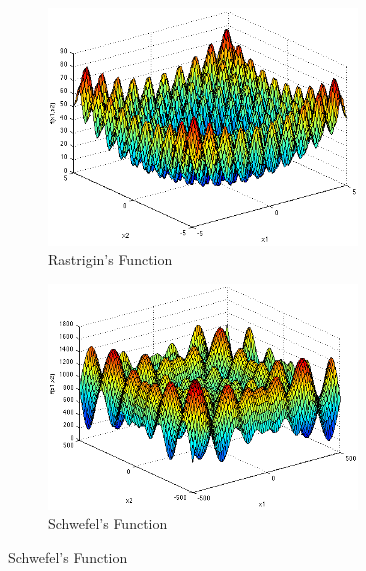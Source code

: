 \documentclass{article}
\begin{document}
    \begin{figure}[H]
        \centering
        \begin{minipage}{.5\textwidth}
            \begin{figure}[H]
                \centering
                \includegraphics[width=0.9\textwidth,height=\textheight,keepaspectratio]{fig_rastrigin}
                \caption{Rastrigin's Function}
            \end{figure}
        \end{minipage}%
        \begin{minipage}{.5\textwidth}
          \centering
            \begin{figure}[H]
                \centering
                \includegraphics[width=0.9\textwidth,height=\textheight,keepaspectratio]{fig_schwef}
                \caption{Schwefel's Function}
            \end{figure}

\end{minipage}
\end{figure}
\end{document}
